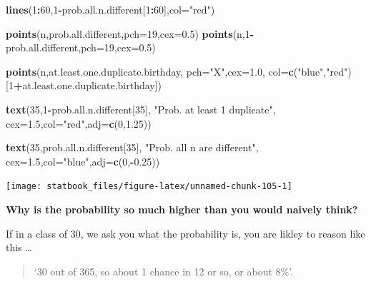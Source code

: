 \documentclass[]{book}
\newenvironment{Shaded}{\begin{snugshade}}{\end{snugshade}}
\newcommand{\DataTypeTok}[1]{\textcolor[rgb]{0.13,0.29,0.53}{#1}}
\newcommand{\DecValTok}[1]{\textcolor[rgb]{0.00,0.00,0.81}{#1}}
\newcommand{\FloatTok}[1]{\textcolor[rgb]{0.00,0.00,0.81}{#1}}
\newcommand{\KeywordTok}[1]{\textcolor[rgb]{0.13,0.29,0.53}{\textbf{#1}}}
\newcommand{\NormalTok}[1]{#1}
\newcommand{\OperatorTok}[1]{\textcolor[rgb]{0.81,0.36,0.00}{\textbf{#1}}}
\newcommand{\StringTok}[1]{\textcolor[rgb]{0.31,0.60,0.02}{#1}}
\begin{document}
\begin{Shaded}
\begin{Highlighting}[]
\KeywordTok{lines}\NormalTok{(}\DecValTok{1}\OperatorTok{:}\DecValTok{60}\NormalTok{,}\DecValTok{1}\OperatorTok{-}\NormalTok{prob.all.n.different[}\DecValTok{1}\OperatorTok{:}\DecValTok{60}\NormalTok{],}\DataTypeTok{col=}\StringTok{"red"}\NormalTok{)}

\KeywordTok{points}\NormalTok{(n,prob.all.different,}\DataTypeTok{pch=}\DecValTok{19}\NormalTok{,}\DataTypeTok{cex=}\FloatTok{0.5}\NormalTok{)}
\KeywordTok{points}\NormalTok{(n,}\DecValTok{1}\OperatorTok{-}\NormalTok{prob.all.different,}\DataTypeTok{pch=}\DecValTok{19}\NormalTok{,}\DataTypeTok{cex=}\FloatTok{0.5}\NormalTok{)}

\KeywordTok{points}\NormalTok{(n,at.least.one.duplicate.birthday,}
       \DataTypeTok{pch=}\StringTok{"X"}\NormalTok{,}\DataTypeTok{cex=}\FloatTok{1.0}\NormalTok{,}
       \DataTypeTok{col=}\KeywordTok{c}\NormalTok{(}\StringTok{"blue"}\NormalTok{,}\StringTok{"red"}\NormalTok{)[}\DecValTok{1}\OperatorTok{+}\NormalTok{at.least.one.duplicate.birthday])}

\KeywordTok{text}\NormalTok{(}\DecValTok{35}\NormalTok{,}\DecValTok{1}\OperatorTok{-}\NormalTok{prob.all.n.different[}\DecValTok{35}\NormalTok{],}
     \StringTok{"Prob. at least 1 duplicate"}\NormalTok{,}
     \DataTypeTok{cex=}\FloatTok{1.5}\NormalTok{,}\DataTypeTok{col=}\StringTok{"red"}\NormalTok{,}\DataTypeTok{adj=}\KeywordTok{c}\NormalTok{(}\DecValTok{0}\NormalTok{,}\FloatTok{1.25}\NormalTok{))}

\KeywordTok{text}\NormalTok{(}\DecValTok{35}\NormalTok{,prob.all.n.different[}\DecValTok{35}\NormalTok{],}
     \StringTok{"Prob. all n are different"}\NormalTok{,}
     \DataTypeTok{cex=}\FloatTok{1.5}\NormalTok{,}\DataTypeTok{col=}\StringTok{"blue"}\NormalTok{,}\DataTypeTok{adj=}\KeywordTok{c}\NormalTok{(}\DecValTok{0}\NormalTok{,}\OperatorTok{-}\FloatTok{0.25}\NormalTok{))}
\end{Highlighting}
\end{Shaded}

\begin{center}\texttt{[image: statbook\_files/figure-latex/unnamed-chunk-105-1]} \end{center}

\textbf{Why is the probability so much higher than you would naively think?}

If in a class of 30, we ask you what the probability is, you are likley to reason like this \ldots{}

\begin{quote}
`30 out of 365, so about 1 chance in 12 or so, or about 8\%'.
\end{quote}
\end{document}

